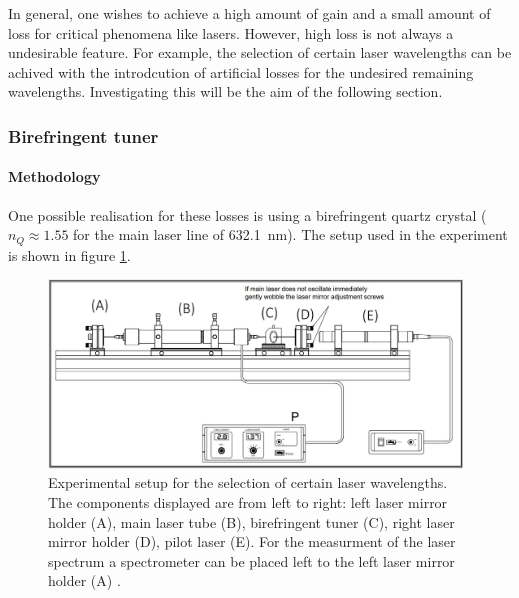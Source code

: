 \documentclass[../main.tex]{subfiles}
\begin{document}
In general, one wishes to achieve a high amount of gain and a small amount of loss for critical phenomena like lasers. However, high loss is not always a undesirable feature. For example, the selection of certain laser wavelengths can be achived with the introdcution of artificial losses for the undesired remaining wavelengths. Investigating this will be the aim of the following section.

\subsubsection{Birefringent tuner}
    \paragraph{Methodology}
        One possible realisation for these losses is using a birefringent quartz crystal ($n_Q \approx\num{1.55}$ for the main laser line of \SI{632.1}{nm}). The setup used in the experiment is shown in figure \ref{fig:5-Aufbau}.

        \begin{figure}[H]
            \centering 
            \includegraphics[width = 11cm]{Bilddateien/5/5-Aufbau.jpg}
            \caption{ Experimental setup for the selection of certain laser wavelengths. The components displayed are from left to right: left laser mirror holder (A), main laser tube (B), birefringent tuner (C), right laser mirror holder (D), pilot laser (E). For the measurment of the laser spectrum a spectrometer can be placed left to the left laser mirror holder (A) \cite[p.22]{doc:HeNeStudentManual}.}
            \label{fig:5-Aufbau}
        \end{figure}
\end{document}
